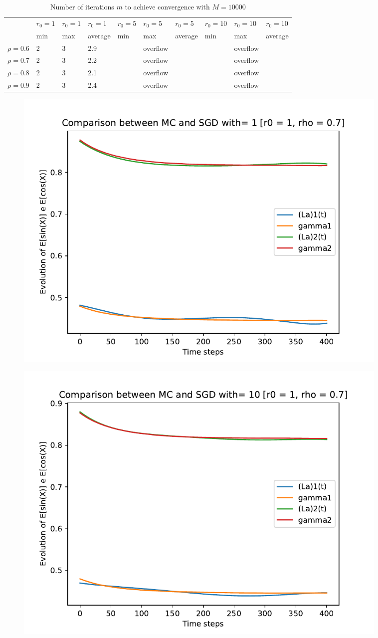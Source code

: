 \documentclass[a4paper,11pt,openright]{report}
\begin{document}
\begin{table}[H]
\centering
\addtolength{\leftskip}{-1.5cm}
\addtolength{\rightskip}{-1.5cm}
\begin{tabular}{|c|lllllllll|}
\hline
$ $ & $r_0 = 1$ & $r_0 = 1$ & $r_0 = 1$ & $r_0 = 5$ & $r_0 = 5$ & $r_0 = 5$ & $r_0 = 10$ & $r_0 = 10$ & $r_0 = 10$  \\
$ $ & min & max & average & min & max & average & min & max & average \\ 
\hline
$\rho = 0.6$ & 2 & 3 & 2.9 &  & overflow &  &  & overflow &  \\

$\rho = 0.7$ & 2 & 3 & 2.2 &  & overflow &  &  & overflow &  \\

$\rho = 0.8$ & 2 & 3 & 2.1 &  & overflow &  &  & overflow & \\

$\rho = 0.9$ & 2 & 3 & 2.4 &  & overflow &  &  & overflow & \\
\hline
\end{tabular}
\caption{Number of iterations $m$ to achieve convergence with $M = 10000$}
\end{table}
\begin{figure}[H]
\centering
\includegraphics[width=0.9\textwidth]{images/graphs T = 4/n = 5, M = 1 sine and cosine.pdf}
\end{figure}
\begin{figure}[H]
\centering
\includegraphics[width=0.9\textwidth]{images/graphs T = 4/n = 5, M = 10 sine and cosine.pdf}
\end{figure}
\end{document}
